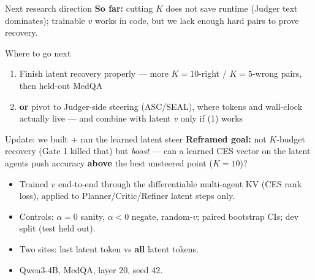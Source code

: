 \documentclass{beamer}
\begin{document}
\begin{frame}{Next research direction}
    \textbf{So far:} cutting $K$ does not save runtime (Judger text dominates);
    trainable $v$ works in code, but we lack enough hard pairs to prove recovery.
    \vspace{0.35cm}
    \begin{block}{Where to go next}
        \begin{enumerate}
            \item Finish latent recovery properly --- more $K{=}10$-right / $K{=}5$-wrong pairs,
                  then held-out MedQA
            \item \textbf{or} pivot to Judger-side steering (ASC/SEAL), where tokens and
                  wall-clock actually live --- and combine with latent $v$ only if (1) works
        \end{enumerate}
    \end{block}
\end{frame}

\begin{frame}{Update: we built + ran the learned latent steer}
    \textbf{Reframed goal:} not $K$-budget recovery (Gate 1 killed that) but
    \emph{boost} --- can a learned CES vector on the latent agents push accuracy
    \textbf{above} the best unsteered point ($K{=}10$)?
    \begin{itemize}
        \item Trained $v$ end-to-end through the differentiable multi-agent KV
              (CES rank loss), applied to Planner/Critic/Refiner latent steps only.
        \item Controls: $\alpha{=}0$ sanity, $\alpha{<}0$ negate, random-$v$;
              paired bootstrap CIs; dev split (test held out).
        \item Two sites: last latent token vs \textbf{all} latent tokens.
        \item Qwen3-4B, MedQA, layer 20, seed 42.
    \end{itemize}
\end{frame}
\end{document}
